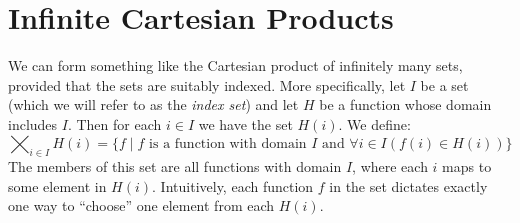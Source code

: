 \documentclass{report}
\begin{document}
\section{Infinite Cartesian Products}
We can form something like the Cartesian product of infinitely many sets, provided that the sets are suitably indexed. 
More specifically, let $I$ be a set (which we will refer to as the \textit{index set}) and let $H$ be a function whose domain includes $I$. Then for each $i\in I$ we have the set $H(i)$.
We define:
\begin{equation*}
\bigtimes_{i\in I}H(i)=\{f\mid f\text{ is a function with domain $I$ and }\forall i\in I(f(i)\in H(i))\}
\end{equation*}
The members of this set are all functions with domain $I$, where each $i$ maps to some element in $H(i)$. Intuitively, each function $f$ in the set dictates exactly one way to ``choose'' one element
from each $H(i)$.
\end{document}
